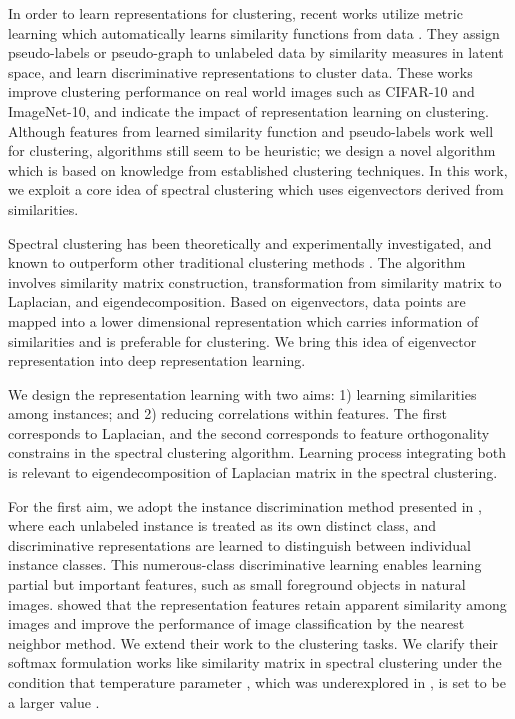 \documentclass{article} \usepackage{iclr2021_conference,times}
\begin{document}
In order to learn representations for clustering, recent works utilize metric learning which automatically learns similarity functions from data \cite{DAC, DCCM}. They assign pseudo-labels or pseudo-graph to unlabeled data by similarity measures in latent space, and learn discriminative representations to cluster data. These works improve clustering performance on real world images such as CIFAR-10 and ImageNet-10, and indicate the impact of representation learning on clustering. Although features from learned similarity function and pseudo-labels work well for clustering, algorithms still seem to be heuristic; we design a novel algorithm which is based on knowledge from established clustering techniques. In this work, we exploit a core idea of spectral clustering which uses eigenvectors derived from similarities.





Spectral clustering has been theoretically and experimentally investigated, and known to outperform other traditional clustering methods \cite{von2007tutorial}. The algorithm involves similarity matrix construction, transformation from similarity matrix to Laplacian, and eigendecomposition. Based on eigenvectors, data points are mapped into a lower dimensional representation which carries information of similarities and is preferable for clustering. We bring this idea of eigenvector representation into deep representation learning.



We design the representation learning with two aims: 1) learning similarities among instances; and 2) reducing correlations within features. The first corresponds to Laplacian, and the second corresponds to feature orthogonality constrains in the spectral clustering algorithm. Learning process integrating both is relevant to eigendecomposition of Laplacian matrix in the spectral clustering.

For the first aim, we adopt the instance discrimination method presented in \cite{wu2018unsupervised}, where each unlabeled instance is treated as its own distinct class, and discriminative representations are learned to distinguish between individual instance classes. This numerous-class discriminative learning enables learning partial but important features, such as small foreground objects in natural images. \cite{wu2018unsupervised} showed that the representation features retain apparent similarity among images and improve the performance of image classification by the nearest neighbor method. We extend their work to the clustering tasks.
We clarify their softmax formulation works like similarity matrix in spectral clustering under the condition that temperature parameter , 
which was underexplored in \cite{wu2018unsupervised}, is set to be a larger value .
\end{document}
